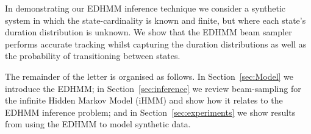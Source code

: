 In demonstrating our EDHMM inference technique we consider a synthetic system  in which the state-cardinality is known and finite, but where each state's duration distribution is unknown. We show that the EDHMM beam sampler performs accurate tracking whilst capturing the duration distributions as well as the probability of transitioning between states.

The remainder of the letter is organised as follows.  In Section~\ref{sec:Model} we introduce the EDHMM; in Section~\ref{sec:inference} we review beam-sampling for the infinite Hidden Markov Model (iHMM) \cite{Beal2002} and show how it relates to the EDHMM inference problem; and in Section~\ref{sec:experiments} we show results from using the EDHMM to model synthetic data.  
